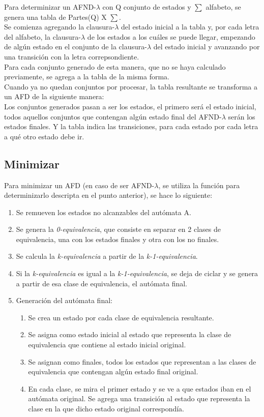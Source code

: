 Para determinizar un AFND-$\lambda$ con Q conjunto de estados y $\sum$ alfabeto, se genera una tabla de Partes(Q) X $\sum$.\\
Se comienza agregando la clausura-$\lambda$ del estado inicial a la tabla y, por cada letra del alfabeto, la clausura-$\lambda$ de los estados a los cuáles se puede llegar, empezando de algún estado en el conjunto de la clausura-$\lambda$ del estado inicial y avanzando por una transición con la letra correpsondiente.\\
Para cada conjunto generado de esta manera, que no se haya calculado previamente, se agrega a la tabla de la misma forma.\\
Cuando ya no quedan conjuntos por procesar, la tabla resultante se transforma a un AFD de la siguiente manera:\\
Los conjuntos generados pasan a ser los estados, el primero será el estado inicial, todos aquellos conjuntos que contengan algún estado final del AFND-$\lambda$ serán los estados finales. Y la tabla indica las transiciones, para cada estado por cada letra a qué otro estado debe ir.


\subsection{Minimizar}

Para minimizar un AFD (en caso de ser AFND-$\lambda$, se utiliza la función para determinizarlo descripta en el punto anterior), se hace lo siguiente:
\begin{enumerate}
	\item Se remueven los estados no alcanzables del autómata A.
	\item Se genera la \textit{0-equivalencia}, que consiste en separar en 2 clases de equivalencia, una con los estados finales y otra con los no finales.
	\item Se calcula la \textit{k-equivalencia} a partir de la \textit{k-1-equivalencia}.
	\item Si la \textit{k-equivalencia} es igual a la \textit{k-1-equivalencia}, se deja de ciclar y se genera a partir de esa clase de equivalencia, el autómata final.
	\item Generación del autómata final:
	\begin{enumerate}
		\item Se crea un estado por cada clase de equivalencia resultante.
		\item Se asigna como estado inicial al estado que representa la clase de equivalencia que contiene al estado inicial original.
		\item Se asignan como finales, todos los estados que representan a las clases de equivalencia que contengan algún estado final original.
		\item En cada clase, se mira el primer estado y se ve a que estados iban en el autómata original. Se agrega una transición al estado que representa la clase en la que dicho estado original correspondía.
	\end{enumerate}
\end{enumerate}
